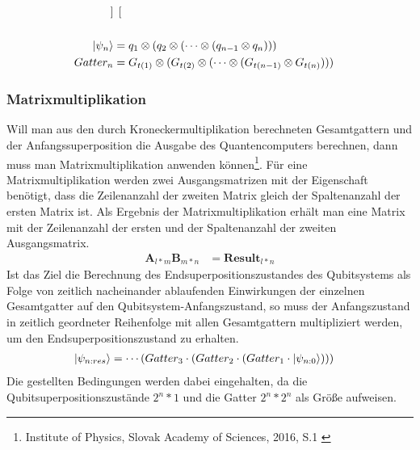 \documentclass[12pt]{report}
\begin{document}
\begin{align*}
\begin{bmatrix}
	\end{bmatrix}\\
	\text{\vspace{5cm}}\\
	\ket{\psi_n} &= q_1 \otimes (q_2 \otimes(\cdots \otimes (q_{n-1} \otimes q_n))) \\
	Gatter_n &= G_{t(1)} \otimes (G_{t(2)} \otimes(\cdots \otimes (G_{t(n-1)} \otimes G_{t(n)})))
	\end{align*}

\subsubsection{Matrixmultiplikation}						%
Will man aus den durch Kroneckermultiplikation berechneten Gesamtgattern und der Anfangssuperposition die Ausgabe des Quantencomputers berechnen, dann muss man Matrixmultiplikation anwenden können\footnote{Institute of Physics, Slovak Academy of Sciences, 2016, S.1 \cite{p221-4}}. Für eine Matrixmultiplikation werden zwei Ausgangsmatrizen mit der Eigenschaft benötigt, dass die Zeilenanzahl der zweiten Matrix gleich der Spaltenanzahl der ersten Matrix ist. Als Ergebnis der Matrixmultiplikation erhält man eine Matrix mit der Zeilenanzahl der ersten und der Spaltenanzahl der zweiten Ausgangsmatrix.
\begin{align*}
	\textbf{A}_{l*m}\textbf{B}_{m*n} &= \textbf{Result}_{l*n}
\end{align*}
Ist das Ziel die Berechnung des Endsuperpositionszustandes des Qubitsystems als Folge von zeitlich nacheinander ablaufenden Einwirkungen der einzelnen Gesamtgatter auf den Qubitsystem-Anfangszustand, so muss der Anfangszustand in zeitlich geordneter Reihenfolge mit allen Gesamtgattern multipliziert werden, um den Endsuperpositionszustand zu erhalten.
\begin{align*}
	\ket{\psi_{n:res}} &= \cdots(Gatter_3 \cdot (Gatter_2 \cdot (Gatter_1 \cdot \ket{\psi_{n:0}})))
\end{align*}
Die gestellten Bedingungen werden dabei eingehalten, da die Qubitsuperpositionszustände $2^n*1$ und die Gatter $2^n*2^n$ als Größe aufweisen.

\newpage
\end{document}
